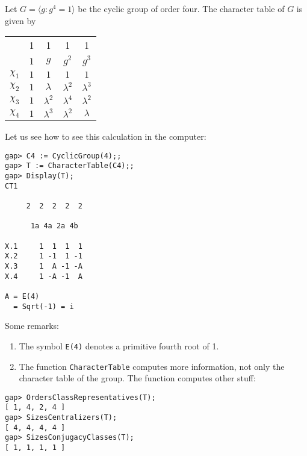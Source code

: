 \begin{example}
	Let $G=\langle g:g^4=1\rangle$ 
	be the cyclic group of order four. The character table of $G$ is given by
	\begin{center}
		\begin{tabular}{|c|cccc|}
			\hline 
			& 1 & 1 & 1 & 1\tabularnewline
			& $1$ & $g$ & $g^2$ & $g^{3}$\tabularnewline
			\hline 
			$\chi_{1}$ & $1$ & $1$ & $1$ & $1$\tabularnewline
			$\chi_{2}$ & $1$ & $\lambda$ & $\lambda^2$ & $\lambda^{3}$\tabularnewline
			$\chi_{3}$ & $1$ & $\lambda^2$ & $\lambda^4$ & $\lambda^{2}$\tabularnewline
			$\chi_{4}$ & $1$ & $\lambda^{3}$ & $\lambda^{2}$ & $\lambda$\tabularnewline
			\hline
		\end{tabular}
	\end{center}
 Let us see how to see this calculation in the computer:
\begin{lstlisting}
gap> C4 := CyclicGroup(4);;                       
gap> T := CharacterTable(C4);;
gap> Display(T);
CT1

     2  2  2  2  2

      1a 4a 2a 4b

X.1     1  1  1  1
X.2     1 -1  1 -1
X.3     1  A -1 -A
X.4     1 -A -1  A

A = E(4)
  = Sqrt(-1) = i
\end{lstlisting}
%
%
%                   
%                   
%
%
%                
%                
Some remarks: 
 \begin{enumerate}
     \item The symbol \lstinline{E(4)} denotes a primitive fourth root of 1.
     \item The function \lstinline{CharacterTable} computes more information, not only the character table of the group. 
     The function computes other stuff: 
 \end{enumerate}
%
%
\begin{lstlisting}
gap> OrdersClassRepresentatives(T);
[ 1, 4, 2, 4 ]
gap> SizesCentralizers(T);
[ 4, 4, 4, 4 ]
gap> SizesConjugacyClasses(T);
[ 1, 1, 1, 1 ]
\end{lstlisting}
\end{example}

